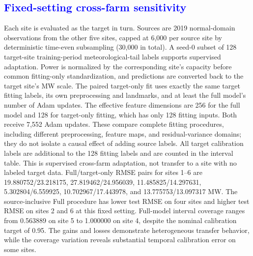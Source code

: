 \subsection{\textcolor{blue}{Fixed-setting cross-farm sensitivity}}
{\color{blue}Each site is evaluated as the target in turn. Sources are 2019 normal-domain observations from the other five sites, capped at 6,000 per source site by deterministic time-even subsampling (30,000 in total). A seed-0 subset of 128 target-site training-period meteorological-tail labels supports supervised adaptation. Power is normalized by the corresponding site's capacity before common fitting-only standardization, and predictions are converted back to the target site's MW scale. The paired target-only fit uses exactly the same target fitting labels, its own preprocessing and landmarks, and at least the full model's number of Adam updates. The effective feature dimensions are 256 for the full model and 128 for target-only fitting, which has only 128 fitting inputs. Both receive 7,552 Adam updates. These compare complete fitting procedures, including different preprocessing, feature maps, and residual-variance domains; they do not isolate a causal effect of adding source labels. All target calibration labels are additional to the 128 fitting labels and are counted in the interval table. This is supervised cross-farm adaptation, not transfer to a site with no labeled target data. Full/target-only RMSE pairs for sites 1--6 are 19.880752/23.218175, 27.819462/24.956039, 11.485825/14.297631, 5.302804/6.559925, 10.702967/17.443978, and 13.775753/13.097317 MW. The source-inclusive Full procedure has lower test RMSE on four sites and higher test RMSE on sites 2 and 6 at this fixed setting. Full-model interval coverage ranges from 0.563889 on site 5 to 1.000000 on site 4, despite the nominal calibration target of 0.95. The gains and losses demonstrate heterogeneous transfer behavior, while the coverage variation reveals substantial temporal calibration error on some sites.}


